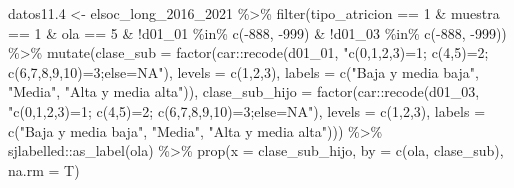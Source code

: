 \documentclass[
  12pt,
]{book}
\newenvironment{Shaded}{\begin{snugshade}}{\end{snugshade}}
\newcommand{\AttributeTok}[1]{\textcolor[rgb]{0.77,0.63,0.00}{#1}}
\newcommand{\DecValTok}[1]{\textcolor[rgb]{0.00,0.00,0.81}{#1}}
\newcommand{\FloatTok}[1]{\textcolor[rgb]{0.00,0.00,0.81}{#1}}
\newcommand{\FunctionTok}[1]{\textcolor[rgb]{0.00,0.00,0.00}{#1}}
\newcommand{\NormalTok}[1]{#1}
\newcommand{\OtherTok}[1]{\textcolor[rgb]{0.56,0.35,0.01}{#1}}
\newcommand{\SpecialCharTok}[1]{\textcolor[rgb]{0.00,0.00,0.00}{#1}}
\newcommand{\StringTok}[1]{\textcolor[rgb]{0.31,0.60,0.02}{#1}}
\begin{document}
\begin{Shaded}
\begin{Highlighting}[]
\NormalTok{datos11}\FloatTok{.4} \OtherTok{\textless{}{-}}\NormalTok{ elsoc\_long\_2016\_2021 }\SpecialCharTok{\%\textgreater{}\%} 
  \FunctionTok{filter}\NormalTok{(tipo\_atricion }\SpecialCharTok{==} \DecValTok{1} \SpecialCharTok{\&}\NormalTok{ muestra }\SpecialCharTok{==} \DecValTok{1} \SpecialCharTok{\&}\NormalTok{ ola }\SpecialCharTok{==} \DecValTok{5} \SpecialCharTok{\&} 
         \SpecialCharTok{!}\NormalTok{d01\_01 }\SpecialCharTok{\%in\%} \FunctionTok{c}\NormalTok{(}\SpecialCharTok{{-}}\DecValTok{888}\NormalTok{, }\SpecialCharTok{{-}}\DecValTok{999}\NormalTok{) }\SpecialCharTok{\&} \SpecialCharTok{!}\NormalTok{d01\_03 }\SpecialCharTok{\%in\%} \FunctionTok{c}\NormalTok{(}\SpecialCharTok{{-}}\DecValTok{888}\NormalTok{, }\SpecialCharTok{{-}}\DecValTok{999}\NormalTok{)) }\SpecialCharTok{\%\textgreater{}\%} 
  \FunctionTok{mutate}\NormalTok{(}\AttributeTok{clase\_sub =} \FunctionTok{factor}\NormalTok{(car}\SpecialCharTok{::}\FunctionTok{recode}\NormalTok{(d01\_01, }\StringTok{"c(0,1,2,3)=1; c(4,5)=2; c(6,7,8,9,10)=3;else=NA"}\NormalTok{), }
                            \AttributeTok{levels =} \FunctionTok{c}\NormalTok{(}\DecValTok{1}\NormalTok{,}\DecValTok{2}\NormalTok{,}\DecValTok{3}\NormalTok{), }
                            \AttributeTok{labels =} \FunctionTok{c}\NormalTok{(}\StringTok{"Baja y media baja"}\NormalTok{, }\StringTok{"Media"}\NormalTok{, }\StringTok{"Alta y media alta"}\NormalTok{)),}
         \AttributeTok{clase\_sub\_hijo =} \FunctionTok{factor}\NormalTok{(car}\SpecialCharTok{::}\FunctionTok{recode}\NormalTok{(d01\_03, }\StringTok{"c(0,1,2,3)=1; c(4,5)=2; c(6,7,8,9,10)=3;else=NA"}\NormalTok{),}
                                 \AttributeTok{levels =} \FunctionTok{c}\NormalTok{(}\DecValTok{1}\NormalTok{,}\DecValTok{2}\NormalTok{,}\DecValTok{3}\NormalTok{), }
                                 \AttributeTok{labels =} \FunctionTok{c}\NormalTok{(}\StringTok{"Baja y media baja"}\NormalTok{, }\StringTok{"Media"}\NormalTok{, }\StringTok{"Alta y media alta"}\NormalTok{))) }\SpecialCharTok{\%\textgreater{}\%} 
\NormalTok{  sjlabelled}\SpecialCharTok{::}\FunctionTok{as\_label}\NormalTok{(ola) }\SpecialCharTok{\%\textgreater{}\%} 
  \FunctionTok{prop}\NormalTok{(}\AttributeTok{x =}\NormalTok{ clase\_sub\_hijo, }\AttributeTok{by =} \FunctionTok{c}\NormalTok{(ola, clase\_sub), }\AttributeTok{na.rm =}\NormalTok{ T)}


\end{Highlighting}
\end{Shaded}
\end{document}

